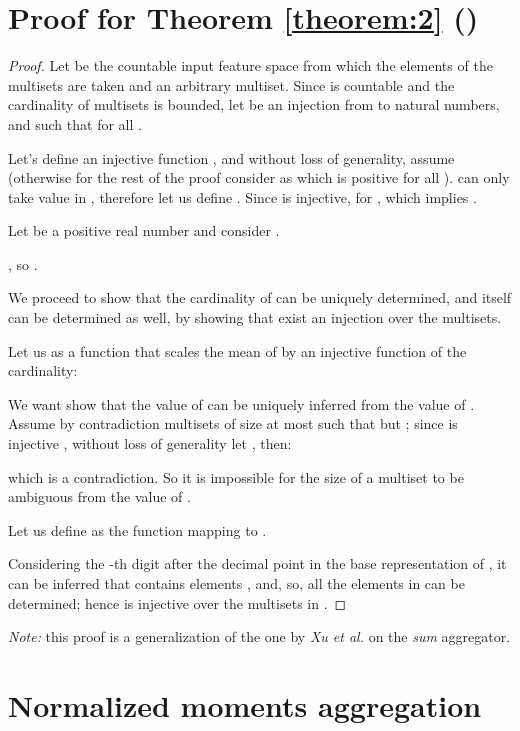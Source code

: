 \documentclass{article}
\begin{document}
\section{Proof for Theorem \ref{theorem:2} ()}
\label{app:proof_th2}
\begin{proof}

Let  be the countable input feature space from which the elements of the multisets are taken and  an arbitrary multiset. Since  is countable and the cardinality of multisets is bounded, let  be an injection from  to natural numbers, and  such that  for all .

Let's define an injective function , and without loss of generality, assume  (otherwise for the rest of the proof consider  as  which is positive for all ).  can only take value in , therefore let us define . Since  is injective,  for , which implies .
 
Let  be a positive real number and consider .

, so . 

We proceed to show that the cardinality of  can be uniquely determined, and  itself can be determined as well, by showing that exist an injection  over the multisets.

Let us  as a function that scales the mean of  by an injective function of the cardinality:


We want show that the value of  can be uniquely inferred from the value of . Assume by contradiction  multisets of size at most  such that  but ; since  is injective , without loss of generality let , then:


which is a contradiction. So it is impossible for the size of a multiset  to be ambiguous from the value of .

Let us define  as the function mapping  to .



Considering the -th digit  after the decimal point in the base  representation of , it can be inferred that  contains  elements , and, so, all the elements in  can be determined; hence  is injective over the multisets in .
\end{proof}
\textit{Note:} this proof is a generalization of the one by \textit{Xu et al.} \cite{xu2018gin} on the \textit{sum} aggregator.



\section{Normalized moments aggregation }
\label{app:moments}
\end{document}
